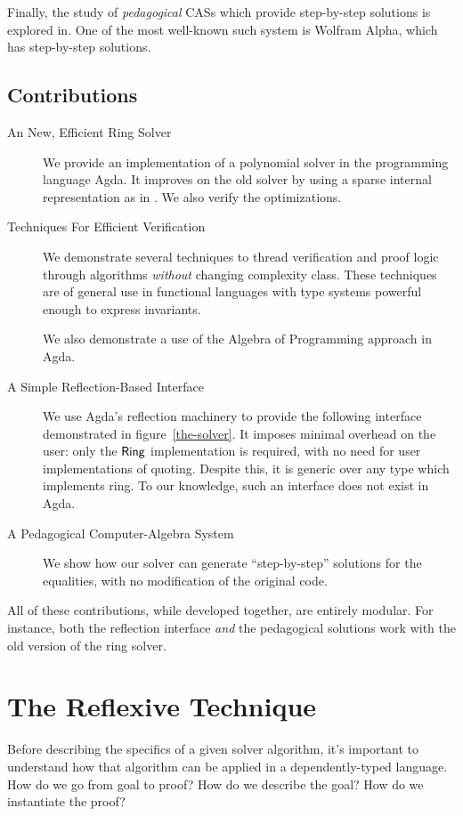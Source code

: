 \documentclass[draft, twocolumn]{article}
\theoremstyle{definition}
\theoremstyle{definition}
\begin{document}
Finally, the study of \emph{pedagogical} CASs which provide step-by-step
solutions is explored in\cite{lioubartsev_constructing_2016}. One of the most
well-known such system is Wolfram
Alpha\cite{wolfram_research_inc._wolframalpha_2019}, which has step-by-step
solutions\cite{the_development_team_step-by-step_2009}.
\subsection{Contributions}
\begin{description}
  \item[An New, Efficient Ring Solver]
    We provide an implementation of a polynomial solver in the programming
    language Agda. It improves on the old solver by using a sparse internal
    representation as in \cite{gregoire_proving_2005}. We also verify the
    optimizations.
  \item[Techniques For Efficient Verification] We demonstrate several techniques
    to thread verification and proof logic through algorithms \emph{without}
    changing complexity class. These techniques are of general use in functional
    languages with type systems powerful enough to express invariants.

    We also demonstrate a use of the Algebra of Programming approach in
    Agda\cite{mu_algebra_2009}.
  \item[A Simple Reflection-Based Interface] We use Agda's reflection machinery
    to provide the following interface demonstrated in figure~\ref{the-solver}.
    It imposes minimal overhead on the user: only the \(\AgdaDatatype{Ring}\)
    implementation is required, with no need for user implementations of
    quoting. Despite this, it is generic over any type which implements ring. To
    our knowledge, such an interface does not exist in Agda.
  \item[A Pedagogical Computer-Algebra System] We show how our solver can
    generate ``step-by-step'' solutions for the equalities, with no modification
    of the original code.
\end{description}
All of these contributions, while developed together, are entirely modular. For
instance, both the reflection interface \emph{and} the pedagogical solutions
work with the old version of the ring solver.
\section{The Reflexive Technique} \label{reflexive}
Before describing the specifics of a given solver algorithm, it's important to
understand how that algorithm can be applied in a dependently-typed language.
How do we go from goal to proof? How do we describe the goal? How do we
instantiate the proof?
\end{document}
